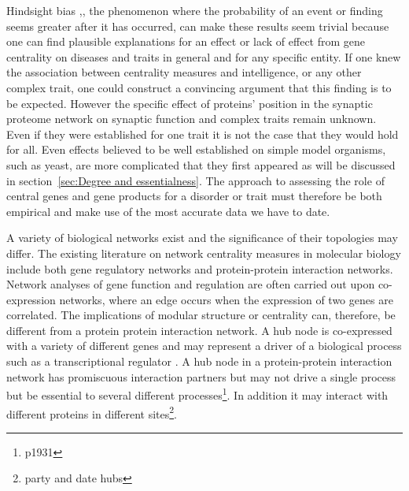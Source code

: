 Hindsight bias \cite{fischhoff1975hindsight},\cite{fischhoff2007early}, the phenomenon where the probability of an event or finding seems greater after it has occurred, can make these results seem trivial because one can find plausible explanations for an effect or lack of effect from gene centrality on diseases and traits in general and for any specific entity. If one knew the association between centrality measures and intelligence, or any other complex trait, one could construct a convincing argument that this finding is to be expected. However the specific effect of proteins' position in the synaptic proteome network on synaptic function and complex traits remain unknown. Even if they were established for one trait it is not the case that they would hold for all. Even effects believed to be well established on simple model organisms, such as yeast, are more complicated that they first appeared as will be discussed in section~\ref{sec:Degree and essentialness}. The approach to assessing the role of central genes and gene products for a disorder or trait must therefore be both empirical and make use of the most accurate data we have to date. 
 
 A variety of biological networks exist and the significance of their topologies may differ. The existing literature on network centrality measures in molecular biology include both  gene regulatory networks and protein-protein interaction networks. Network analyses of gene function and regulation are often carried out upon co-expression networks, where an edge occurs when the expression of two genes are correlated\cite{zhang2005general}. The implications of modular structure or centrality can, therefore, be different from a protein protein interaction network. A hub node is co-expressed with a variety of different genes and may represent a driver of a biological process such as a transcriptional regulator \cite{parikshak2015systems}.
 A hub node in a protein-protein interaction network has promiscuous interaction partners but may not drive a single process but be essential to several different processes\cite{patil2010hub}\footnote{p1931}. In addition it may interact with different proteins in different sites\cite{han2004evidence}\footnote{party and date hubs}.
 


